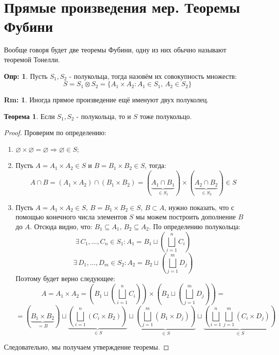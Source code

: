 \documentclass[12pt]{article}
\newcommand{\VN}{\varnothing}
\theoremstyle{definition}
\newtheorem{defn}{Опр:}
\newtheorem{rem}{Rm:}
\newtheorem{theorem}{Теорема}
\begin{document}
\section*{Прямые произведения мер. Теоремы Фубини}

Вообще говоря будет две теоремы Фубини, одну из них обычно называют теоремой Тонелли.

\begin{defn}
	Пусть $S_1, S_2$ - полукольца, тогда назовём их  совокупность множеств: 
	$$
		S = S_1 \otimes S_2 = \{A_1 \times A_2 \colon A_1 \in S_1, \, A_2 \in S_2 \}
	$$
\end{defn}
\begin{rem}
	Иногда прямое произведение ещё именуют  двух полуколец.
\end{rem}

\begin{theorem}
	Если $S_1, S_2$ - полукольца, то и $S$ тоже полукольцо.
\end{theorem}

\begin{proof}
	Проверим по определению:
	\begin{enumerate}[label=\arabic*)]
		\item $\VN \times \VN = \VN \Rightarrow \VN \in S$;
		\item Пусть $A = A_1 \times A_2 \in S$ и $B = B_1 \times B_2 \in S$, тогда:
		$$
			A \cap B = (A_1 \times A_2) \cap (B_1 \times B_2) = (\underbrace{A_1 \cap B_1}_{\in S_1}) \times (\underbrace{A_2 \cap B_2}_{\in S_2}) \in S
		$$
		\item Пусть $A = A_1 \times A_2 \in S, \, B = B_1 \times B_2 \in S, \, B \subset A$, нужно показать, что с помощью конечного числа элементов $S$ мы можем построить дополнение $B$ до $A$. Отсюда видно, что: $B_1 \subseteq A_1, \, B_2 \subseteq A_2$. По определению полукольца:
		$$
			\exists \, C_1, \dots, C_n \in S_1 \colon A_1 = B_1 \sqcup \left(\bigsqcup\limits_{i = 1}^{n}C_i\right)
		$$
		$$
			\exists \, D_1, \dots, D_m \in S_2 \colon A_2 = B_2 \sqcup \left(\bigsqcup\limits_{j = 1}^{m}D_j\right)
		$$
		Поэтому будет верно следующее:
		$$
			A = A_1 \times A_2 = \left(B_1 \sqcup \left(\bigsqcup\limits_{i = 1}^{n}C_i\right)\right) \times \left(B_2 \sqcup \left(\bigsqcup\limits_{j = 1}^{m}D_j\right)\right) = 
		$$
		$$
			= (\underbrace{B_1 \times B_2}_{ = B})\sqcup \underbrace{\left(\bigsqcup\limits_{i = 1}^{n} \left(C_i \times B_2\right) \right)}_{\in S} \sqcup \underbrace{\left(\bigsqcup\limits_{j = 1}^{m} (B_1 \times D_j)\right)}_{\in S} \sqcup \underbrace{\left(\bigsqcup\limits_{i = 1}^{n}\bigsqcup\limits_{j = 1}^{m}(C_i \times D_j) \right)}_{\in S}
		$$
	\end{enumerate}
	Следовательно, мы получаем утверждение теоремы.
\end{proof}
\end{document}
